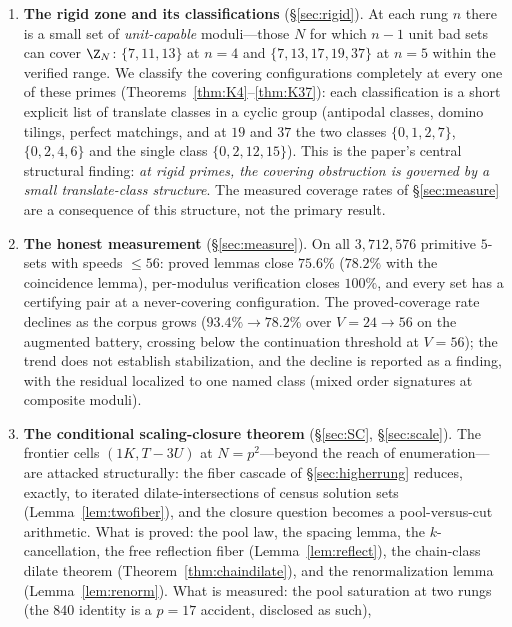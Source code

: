 \begin{enumerate}[leftmargin=1.6em,itemsep=2pt]
  (Lemma~\ref{lem:lift}), and a class-group reduction at prime moduli
  (Lemma~\ref{lem:class}).
\item \textbf{The rigid zone and its classifications}
  (\S\ref{sec:rigid}). At each rung $n$ there is a small set of
  \emph{unit-capable} moduli---those $N$ for which $n-1$ unit bad sets can
  cover $\Z_N$: $\{7,11,13\}$ at $n=4$ and $\{7,13,17,19,37\}$ at $n=5$
  within the verified range. We classify the covering configurations
  completely at every one of these primes
  (Theorems~\ref{thm:K4}--\ref{thm:K37}): each classification is a short
  explicit list of translate classes in a cyclic group (antipodal classes,
  domino tilings, perfect matchings, and at $19$ and $37$ the two classes
  $\{0,1,2,7\}$, $\{0,2,4,6\}$ and the single class $\{0,2,12,15\}$).
  This is the paper's central structural finding: \emph{at rigid primes,
  the covering obstruction is governed by a small translate-class
  structure}. The measured coverage rates of \S\ref{sec:measure} are a
  consequence of this structure, not the primary result.
\item \textbf{The honest measurement} (\S\ref{sec:measure}). On all
  $3{,}712{,}576$ primitive $5$-sets with speeds $\le 56$: proved lemmas
  close $75.6\%$ ($78.2\%$ with the coincidence lemma), per-modulus
  verification closes $100\%$, and every set has a certifying pair at a
  never-covering configuration. The proved-coverage rate declines as the
  corpus grows ($93.4\%\to78.2\%$ over $V=24\to56$ on the augmented
  battery, crossing below the continuation threshold at $V=56$); the trend
  does not establish stabilization, and the decline is reported as a
  finding, with the residual localized to one named class (mixed order
  signatures at composite moduli).
\item \textbf{The conditional scaling-closure theorem}
  (\S\ref{sec:SC}, \S\ref{sec:scale}). The frontier cells
  $(1K,T{-}3U)$ at $N=p^2$---beyond the reach of enumeration---are
  attacked structurally: the fiber cascade of \S\ref{sec:higherrung}
  reduces, exactly, to iterated dilate-intersections of census solution
  sets (Lemma~\ref{lem:twofiber}), and the closure question becomes a
  pool-versus-cut arithmetic. What is proved: the pool law, the spacing
  lemma, the $k$-cancellation, the free reflection fiber
  (Lemma~\ref{lem:reflect}), the chain-class dilate theorem
  (Theorem~\ref{thm:chaindilate}), and the renormalization lemma
  (Lemma~\ref{lem:renorm}). What is measured: the pool saturation at two
  rungs (the $840$ identity is a $p=17$ accident, disclosed as such),

\end{enumerate}
